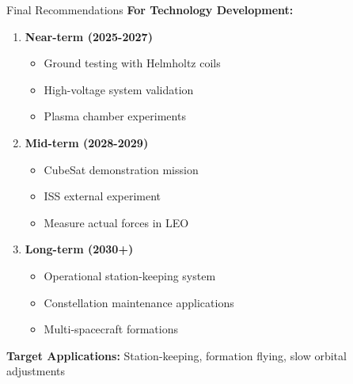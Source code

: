 \documentclass[aspectratio=169]{beamer}
\begin{document}
\begin{frame}{Final Recommendations}
\textbf{For Technology Development:}
\begin{enumerate}
    \item \textbf{Near-term (2025-2027)}
    \begin{itemize}
        \item Ground testing with Helmholtz coils
        \item High-voltage system validation
        \item Plasma chamber experiments
    \end{itemize}

    \item \textbf{Mid-term (2028-2029)}
    \begin{itemize}
        \item CubeSat demonstration mission
        \item ISS external experiment
        \item Measure actual forces in LEO
    \end{itemize}

    \item \textbf{Long-term (2030+)}
    \begin{itemize}
        \item Operational station-keeping system
        \item Constellation maintenance applications
        \item Multi-spacecraft formations
    \end{itemize}
\end{enumerate}

\vspace{1em}
\textbf{Target Applications:} Station-keeping, formation flying, slow orbital adjustments
\end{frame}
\end{document}
